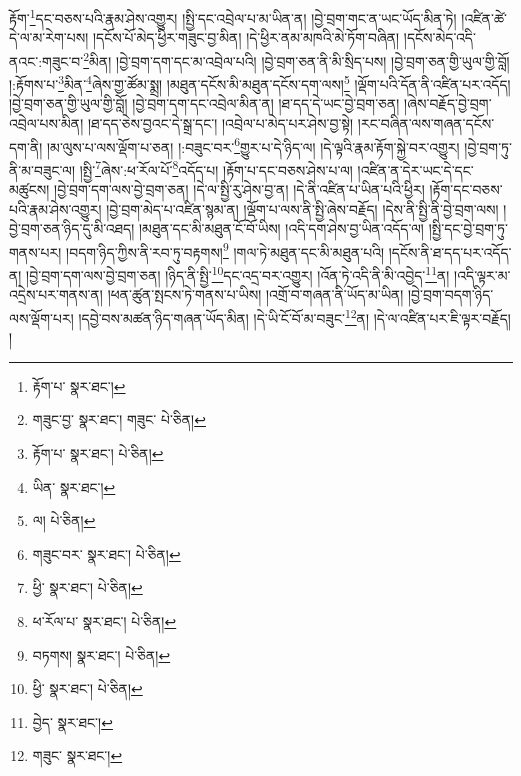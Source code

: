 རྟོག་\footnote{རྟོག་པ་  སྣར་ཐང་། }དང་བཅས་པའི་རྣམ་ཤེས་འགྱུར། །སྤྱི་དང་འབྲེལ་པ་མ་ཡིན་ན། །བྱེ་བྲག་གང་ན་ཡང་ཡོད་མིན་ཏེ། །འཛིན་ཚེ་དེ་ལ་མ་རེག་པས། །དངོས་པོ་མེད་ཕྱིར་གཟུང་བྱ་མིན། །དེ་ཕྱིར་ནམ་མཁའི་མེ་ཏོག་བཞིན། །དངོས་མེད་འདི་ནའང་:གཟུང་བ་\footnote{གཟུང་བྱ་  སྣར་ཐང་། གཟུང་  པེ་ཅིན། }མིན། །བྱེ་བྲག་དག་དང་མ་འབྲེལ་པའི། །བྱེ་བྲག་ཅན་ནི་མི་སྲིད་པས། །བྱེ་བྲག་ཅན་གྱི་ཡུལ་གྱི་བློ། །:རྟོགས་པ་\footnote{རྟོག་པ་  སྣར་ཐང་།  པེ་ཅིན། }མིན་\footnote{ཡིན་  སྣར་ཐང་། }ཞེས་གྱ་ཚོམ་སྨྲ། །མཐུན་དངོས་མི་མཐུན་དངོས་དག་ལས།\footnote{ལ།  པེ་ཅིན། } །ལྡོག་པའི་དོན་ནི་འཛིན་པར་འདོད། །བྱེ་བྲག་ཅན་གྱི་ཡུལ་གྱི་བློ། །བྱེ་བྲག་དག་དང་འབྲེལ་མིན་ན། །ཐ་དད་དེ་ཡང་བྱེ་བྲག་ཅན། །ཞེས་བརྗོད་བྱེ་བྲག་འབྲེལ་པས་མིན། །ཐ་དད་ཅེས་བྱའང་དེ་སྒྲ་དང་། །འབྲེལ་པ་མེད་པར་ཤེས་བྱ་སྟེ། །རང་བཞིན་ལས་གཞན་དངོས་དག་ནི། །མ་ལུས་པ་ལས་ལྡོག་པ་ཅན། །:བཟུང་བར་\footnote{གཟུང་བར་  སྣར་ཐང་།  པེ་ཅིན། }གྱུར་པ་དེ་ཉིད་ལ། །དེ་ལྟའི་རྣམ་རྟོག་སྐྱེ་བར་འགྱུར། །བྱེ་བྲག་ཏུ་ནི་མ་བཟུང་ལ། །སྤྱི་\footnote{ཕྱི་  སྣར་ཐང་།  པེ་ཅིན། }ཞེས་:ཕ་རོལ་པོ་\footnote{ཕ་རོལ་པ་  སྣར་ཐང་།  པེ་ཅིན། }འདོད་པ། །རྟོག་པ་དང་བཅས་ཤེས་པ་ལ། །འཛིན་ན་དེར་ཡང་དེ་དང་མཚུངས། །བྱེ་བྲག་དག་ལས་བྱེ་བྲག་ཅན། །དེ་ལ་སྤྱི་རུ་ཤེས་བྱ་ན། །དེ་ནི་འཛིན་པ་ཡིན་པའི་ཕྱིར། །རྟོག་དང་བཅས་པའི་རྣམ་ཤེས་འགྱུར། །བྱེ་བྲག་མེད་པ་འཛིན་སྙམ་ན། །ལྡོག་པ་ལས་ནི་སྤྱི་ཞེས་བརྗོད། །དེས་ནི་སྤྱི་ནི་བྱེ་བྲག་ལས། །བྱེ་བྲག་ཅན་ཉིད་དུ་མི་འཐད། །མཐུན་དང་མི་མཐུན་ངོ་བོ་ཡིས། །འདི་དག་ཤེས་བྱ་ཡིན་འདོད་ལ། །སྤྱི་དང་བྱེ་བྲག་ཏུ་གནས་པར། །བདག་ཉིད་ཀྱིས་ནི་རབ་ཏུ་བརྟགས།\footnote{བཏགས།  སྣར་ཐང་།  པེ་ཅིན། } །གལ་ཏེ་མཐུན་དང་མི་མཐུན་པའི། །དངོས་ནི་ཐ་དད་པར་འདོད་ན། །བྱེ་བྲག་དག་ལས་བྱེ་བྲག་ཅན། །ཉིད་ནི་སྤྱི་\footnote{ཕྱི་  སྣར་ཐང་།  པེ་ཅིན། }དང་འདྲ་བར་འགྱུར། །འོན་ཏེ་འདི་ནི་མི་འབྱེད་\footnote{བྱེད་  སྣར་ཐང་། }ན། །འདི་ལྟར་མ་འདྲེས་པར་གནས་ན། །ཕན་ཚུན་སྤངས་ཏེ་གནས་པ་ཡིས། །འགྲོ་བ་གཞན་ནི་ཡོད་མ་ཡིན། །བྱེ་བྲག་བདག་ཉིད་ལས་ལྡོག་པར། །དབྱེ་བས་མཚན་ཉིད་གཞན་ཡོད་མིན། །དེ་ཡི་ངོ་བོ་མ་བཟུང་\footnote{གཟུང་  སྣར་ཐང་། }ན། །དེ་ལ་འཛིན་པར་ཇི་ལྟར་བརྗོད། །
